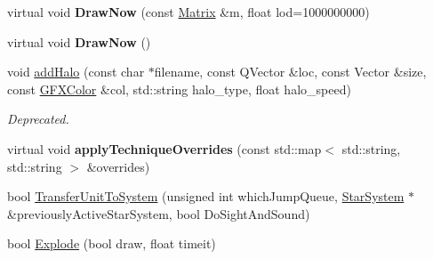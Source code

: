 \begin{DoxyCompactItemize}
\item 
virtual void {\bfseries Draw\+Now} (const \hyperlink{classMatrix}{Matrix} \&m, float lod=1000000000)\hypertarget{classGameUnit_ac499f6361446eed9eb43b6153a9e0924}{}\label{classGameUnit_ac499f6361446eed9eb43b6153a9e0924}

\item 
virtual void {\bfseries Draw\+Now} ()\hypertarget{classGameUnit_a5c29dcffb82f4ae08dd763568504413e}{}\label{classGameUnit_a5c29dcffb82f4ae08dd763568504413e}

\item 
void \hyperlink{classGameUnit_a1b65655a514df6cb21ae9cbf45994bc5}{add\+Halo} (const char $\ast$filename, const Q\+Vector \&loc, const Vector \&size, const \hyperlink{structGFXColor}{G\+F\+X\+Color} \&col, std\+::string halo\+\_\+type, float halo\+\_\+speed)\hypertarget{classGameUnit_a1b65655a514df6cb21ae9cbf45994bc5}{}\label{classGameUnit_a1b65655a514df6cb21ae9cbf45994bc5}

\begin{DoxyCompactList}\small\item\em Deprecated. \end{DoxyCompactList}\item 
virtual void {\bfseries apply\+Technique\+Overrides} (const std\+::map$<$ std\+::string, std\+::string $>$ \&overrides)\hypertarget{classGameUnit_a7b7fa6f2683b6e4b356eb7b0b771abd6}{}\label{classGameUnit_a7b7fa6f2683b6e4b356eb7b0b771abd6}

\item 
bool \hyperlink{classGameUnit_abe09b07b8312b8d04502645f3908b126}{Transfer\+Unit\+To\+System} (unsigned int which\+Jump\+Queue, \hyperlink{classStarSystem}{Star\+System} $\ast$\&previously\+Active\+Star\+System, bool Do\+Sight\+And\+Sound)
\item 
bool \hyperlink{classGameUnit_af6ee1a18d0294030c1dda77e88c2b19a}{Explode} (bool draw, float timeit)\hypertarget{classGameUnit_af6ee1a18d0294030c1dda77e88c2b19a}{}\label{classGameUnit_af6ee1a18d0294030c1dda77e88c2b19a}


\end{DoxyCompactItemize}

